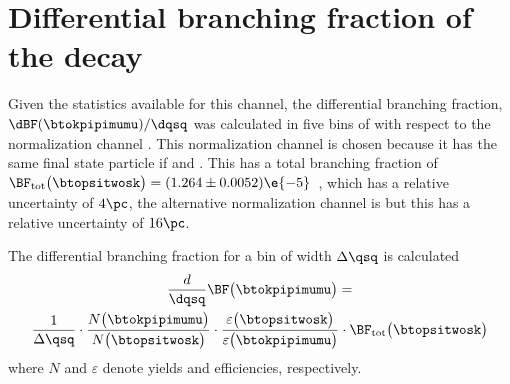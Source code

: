 \section[Differential branching fraction of the decay \btokpipimumu]
{Differential branching fraction of the decay \tmath{\btokpipimumu}}

Given the statistics available for this channel, the differential branching fraction,
$\dBF(\btokpipimumu)/\dqsq$ was calculated in five bins of \qsq with respect to the normalization
channel \btopsitwosk.
This normalization channel is chosen because it has the same final state particle if
\psitwostojpsipipi and \jpsitomumu.
This has a total branching fraction of
$\BF_\mathrm{tot}\big(\btopsitwosk\big) = (1.264 \pm 0.0052)\e{-5}$~\cite{PDG2012},
which has a relative uncertainty of $4\pc$, the alternative normalization channel is
\btojpsikpipi but this has a relative uncertainty of $16\pc$.

The differential branching fraction for a bin of width $\Delta\qsq$ is calculated
\begin{multline}
  \frac{d}{\dqsq}\BF\big(\btokpipimumu\big)=
  \\
  \frac{1}{\Delta\qsq} \cdot
  \frac{N\big(\btokpipimumu\big)}{N\big(\btopsitwosk\big)} \cdot
  \frac{\varepsilon\big(\btopsitwosk\big)}{\varepsilon\big(\btokpipimumu\big)} \cdot
  \BF_\mathrm{tot}\big(\btopsitwosk\big)
  \label{eq:kpipi:diffbf}
\end{multline}
where $N$ and $\varepsilon$ denote yields and efficiencies, respectively.


